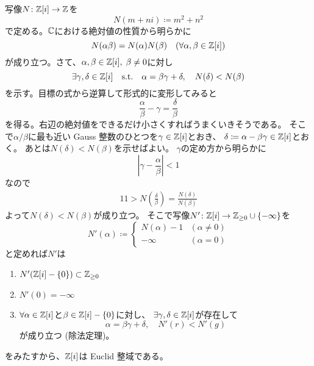 \documentclass[report]{jlreq}
\begin{document}
\begin{answer}
    写像$N \colon \mathbb{Z}[i] \to \mathbb{Z}$を
    \begin{equation}
        N(m + ni) \coloneqq m^2 + n^2
    \end{equation}
    で定める。$\mathbb{C}$における絶対値の性質から明らかに
    \begin{equation}
        N(\alpha \beta) = N(\alpha) N(\beta)
        \quad (\forall \alpha, \beta \in \mathbb{Z}[i])
    \end{equation}
    が成り立つ。さて、$\alpha, \beta \in \mathbb{Z}[i],\; \beta \neq 0$に対し
    \begin{equation}
        \exists \gamma, \delta \in \mathbb{Z}[i]
        \quad \text{s.t.} \quad
        \alpha = \beta \gamma + \delta,\quad N(\delta) < N(\beta)
    \end{equation}
    を示す。目標の式から逆算して形式的に変形してみると
    \begin{equation}
        \frac{\alpha}{\beta} - \gamma = \frac{\delta}{\beta}
    \end{equation}
    を得る。右辺の絶対値をできるだけ小さくすればうまくいきそうである。
    そこで$\alpha / \beta$に最も近い Gauss 整数のひとつを$\gamma \in \mathbb{Z}[i]$とおき、
    $\delta \coloneqq \alpha - \beta \gamma \in \mathbb{Z}[i]$とおく。
    あとは$N(\delta) < N(\beta)$を示せばよい。
    $\gamma$の定め方から明らかに
    \begin{equation}
        \left| \gamma - \frac{\alpha}{\beta} \right| < 1
    \end{equation}
    なので
    \begin{alignat}{1}
        1 > N\left(\frac{\delta}{\beta}\right)
            = \frac{N(\delta)}{N(\beta)}
    \end{alignat}
    よって$N(\delta) < N(\beta)$が成り立つ。
    そこで写像$N' \colon \mathbb{Z}[i] \to \mathbb{Z}_{\ge 0} \cup \{ -\infty \}$を
    \begin{equation}
        N'(\alpha) \coloneqq \begin{cases}
            N(\alpha) - 1 & (\alpha \neq 0) \\
            -\infty & (\alpha = 0)
        \end{cases}
    \end{equation}
    と定めれば$N'$は
    \begin{enumerate}
        \item $N'(\mathbb{Z}[i] - \{0\}) \subset \mathbb{Z}_{\ge 0}$
        \item $N'(0) = -\infty$
        \item $\forall \alpha \in \mathbb{Z}[i]$と$\beta \in \mathbb{Z}[i] - \{0\}$に対し、
            $\exists \gamma, \delta \in \mathbb{Z}[i]$が存在して
            \begin{equation}
                \alpha = \beta \gamma + \delta,\quad N'(r) < N'(g)
            \end{equation}
            が成り立つ (除法定理)。
    \end{enumerate}
    をみたすから、$\mathbb{Z}[i]$は Euclid 整域である。
\end{answer}
\end{document}
